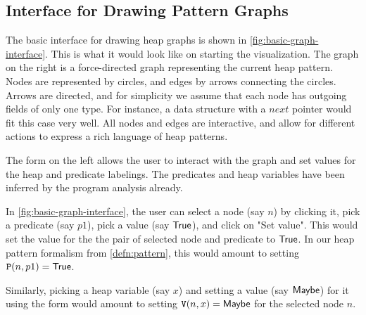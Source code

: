 \subsection{Interface for Drawing Pattern Graphs}

The basic interface for drawing heap graphs is shown in
\autoref{fig:basic-graph-interface}. This is what it would look like on starting the
visualization. The graph on the right is a force-directed graph representing the current
heap pattern. Nodes are represented by circles, and edges by arrows connecting the
circles. Arrows are directed, and for simplicity we assume that each node has outgoing
fields of only one type. For instance, a data structure with a $next$ pointer would fit
this case very well. All nodes and edges are interactive, and allow for different
actions to express a rich language of heap patterns.

The form on the left allows the user to interact with the graph and set values for the
heap and predicate labelings. The predicates and heap variables have been inferred by
the program analysis already.

\begin{ex}
\label{ex:basic-graph-interface}
In \autoref{fig:basic-graph-interface}, the user can select a node (say $n$) by clicking
it, pick a predicate (say $p1$), pick a value (say $\mathsf{True}$), and click on "Set value".
This would set the value for the the pair of selected node and predicate to $\mathsf{True}$. In
our heap pattern formalism from \autoref{defn:pattern}, this would amount to setting
$\mathtt{P}(n, p1) = \mathsf{True}$.

Similarly, picking a heap variable (say $x$) and setting a value (say $\mathsf{Maybe}$) for it
using the form would amount to setting $\mathtt{V}(n,x) = \mathsf{Maybe}$ for the selected node
$n$.
\end{ex}

